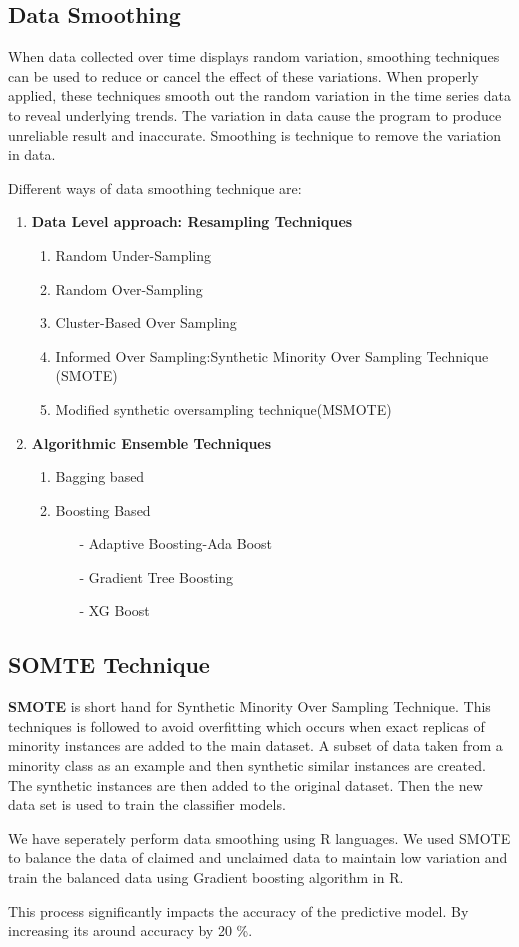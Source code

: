 \subsection{Data Smoothing}
When data collected over time displays random variation, smoothing techniques can be used to reduce or cancel the effect of these variations. When properly applied, these techniques smooth out the random variation in the time series data to reveal underlying trends. The variation  in data cause the program to  produce unreliable result and inaccurate. Smoothing is technique to remove the variation in data. 
\par
Different ways of data smoothing technique are:
\begin{enumerate}
\item \textbf{Data Level approach: Resampling Techniques}
	\begin{enumerate}
	\item Random Under-Sampling
	\item Random Over-Sampling
	\item Cluster-Based Over Sampling
	\item Informed Over Sampling:Synthetic Minority Over Sampling Technique (SMOTE)
	\item Modified synthetic oversampling technique(MSMOTE)
	\end{enumerate}

\item \textbf{Algorithmic Ensemble Techniques}
	\begin{enumerate}
	\item Bagging based
	\item Boosting Based
		\begin{itemize}
		\item[-] Adaptive Boosting-Ada Boost
		\item[-] Gradient Tree Boosting
		\item[-] XG Boost
		\end{itemize}
	\end{enumerate}

\end{enumerate}
\subsection{SOMTE Technique}
\textbf{SMOTE} is short hand for Synthetic Minority Over Sampling Technique. This techniques is followed to avoid overfitting which occurs when exact replicas of minority instances are added to the main dataset. A subset of data taken from a minority class as an example and then synthetic similar instances are created. The synthetic instances are then added to the original dataset. Then the new data set is used to train the classifier models.\cite{witten2016data}
\par 
We have seperately perform data smoothing using R languages. We used SMOTE to balance the data of claimed and unclaimed data to maintain low variation and train the balanced data using Gradient boosting algorithm in R. 
\par 
This process significantly impacts the accuracy of the predictive model.  By increasing its around accuracy by 20 \%.

